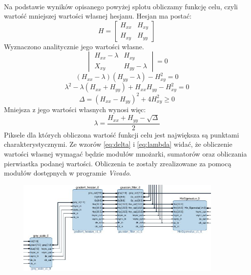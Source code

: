 \paragraph*{}
Na podstawie wyników opisanego powyżej splotu obliczamy funkcję celu, czyli wartość mniejszej wartości własnej hesjanu. Hesjan ma postać:
\begin{equation}
H=
	\begin{bmatrix}
	H_{xx} & H_{xy}\\
	H_{xy} & H_{yy}
	\end{bmatrix}
\end{equation}
Wyznaczono analitycznie jego wartości własne.
\begin{equation}
\begin{vmatrix}
H_{xx}-\lambda & H_{xy} \\
X_{xy} & H_{yy}-\lambda
\end{vmatrix}=0
\end{equation}
\begin{equation}
(H_{xx}-\lambda)(H_{yy}-\lambda)-H_{xy}^2=0
\end{equation}
\begin{equation}
\lambda^2-\lambda(H_{xx}+H_{yy})+H_{xx}H_{yy}-H_{xy}^2=0
\end{equation}
\begin{equation}
\label{eq:delta}
\Delta=(H_{xx}-H_{yy})^2+4H_{xy}^2 \geqslant 0
\end{equation}
Mniejsza z jego wartości własnych wynosi więc:
\begin{equation}
\label{eq:lambda}
\lambda=\frac{H_{xx}+H_{yy}-\sqrt{\Delta}}{2}
\end{equation}
Piksele dla których obliczona wartość funkcji celu jest największa są punktami charakterystycznymi. Ze wzorów \ref{eq:delta} i \ref{eq:lambda} widać, że obliczenie wartości własnej wymagać będzie modułów mnożarki, sumatorów oraz obliczania pierwiastka podanej wartości. Obliczenia te zostały zrealizowane za pomocą modułów dostępnych w programie \textit{Vivado}.

\begin{figure}[H]
	\centering
	\includegraphics[width=4in]{mineig_vivado.jpg}
\end{figure}

